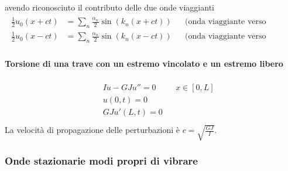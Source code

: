 \documentclass[letterpaper,10pt,italian]{jupyterBook}
\begin{document}
\sphinxAtStartPar
avendo riconosciuto il contributo delle due onde viaggianti
\begin{equation*}
\begin{split}\begin{aligned}
  \frac{1}{2} u_0(x+ct) & = \sum_n \frac{\alpha_n}{2} \sin(k_n(x+ct)) && \text{(onda viaggiante verso sinistra)} \\
  \frac{1}{2} u_0(x-ct) & = \sum_n \frac{\alpha_n}{2} \sin(k_n(x-ct)) && \text{(onda viaggiante verso destra)}
\end{aligned}\end{split}
\end{equation*}

\paragraph{Torsione di una trave con un estremo vincolato e un estremo libero}
\label{\detokenize{ch/waves/waves-notes:torsione-di-una-trave-con-un-estremo-vincolato-e-un-estremo-libero}}\begin{equation*}
\begin{split}\begin{aligned}
  && I \ddot{u} - GJ u'' = 0 && x \in [0,L] \\
  && u(0,t) = 0 \\
  && GJu'(L,t) = 0 \\
\end{aligned}\end{split}
\end{equation*}
\sphinxAtStartPar
La velocità di propagazione delle perturbazioni è \(c = \sqrt{\frac{GJ}{I}}\).
\subsubsection*{Onde stazionarie \sphinxhyphen{} modi propri di vibrare}
\end{document}
